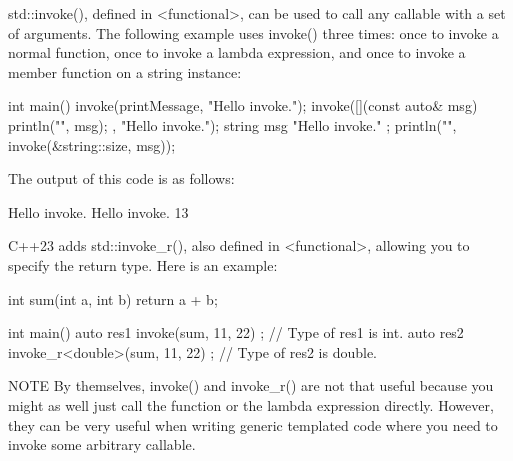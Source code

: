 
std::invoke(), defined in <functional>, can be used to call any callable with a set of arguments. The following example uses invoke() three times: once to invoke a normal function, once to invoke a lambda expression, and once to invoke a member function on a string instance:

\begin{cpp}
int main()
{
    invoke(printMessage, "Hello invoke.");
    invoke([](const auto& msg) { println("{}", msg); }, "Hello invoke.");
    string msg { "Hello invoke." };
    println("{}", invoke(&string::size, msg));
}
\end{cpp}

The output of this code is as follows:

\begin{shell}
Hello invoke.
Hello invoke.
13
\end{shell}


C++23 adds std::invoke\_r(), also defined in <functional>, allowing you to specify the return type. Here is an example:

\begin{cpp}
int sum(int a, int b) { return a + b; }

int main()
{
    auto res1 { invoke(sum, 11, 22) }; // Type of res1 is int.
    auto res2 { invoke_r<double>(sum, 11, 22) }; // Type of res2 is double.
}
\end{cpp}

\begin{myNotic}{NOTE}
By themselves, invoke() and invoke\_r() are not that useful because you might as well just call the function or the lambda expression directly. However, they can be very useful when writing generic templated code where you need to invoke some arbitrary callable.
\end{myNotic}







